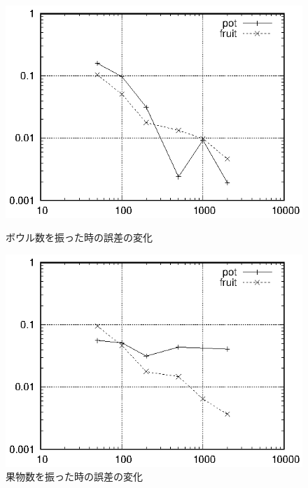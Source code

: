 \documentclass[a4j]{jarticle}
\begin{document}
\begin{figure}[tbp]
 \begin{minipage}{0.5\hsize}
  \begin{center}
   \includegraphics[width=\hsize]{fig/punch_pot.eps}
  \end{center}
  \caption{ボウル数を振った時の誤差の変化}
  \label{fig:punch_bowl}
 \end{minipage}
 \begin{minipage}{0.5\hsize}
  \begin{center}
   \includegraphics[width=\hsize]{fig/punch_fruit.eps}
  \end{center}
  \caption{果物数を振った時の誤差の変化}
  \label{fig:punch_fruit}
 \end{minipage}
\end{figure}
\end{document}
